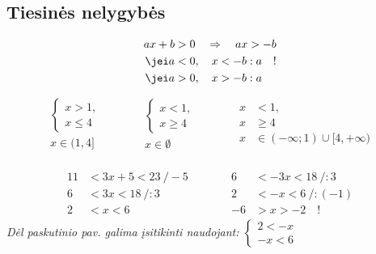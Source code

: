 
\subsection{Tiesinės nelygybės}
\begin{align*}
    \begin{aligned}
        ax + b > 0&\quad\Rightarrow\quad ax > -b     \\
        \jei a < 0&,\quad x < - b : a \quad !        \\
        \jei a > 0&,\quad x > - b : a                \\
    \end{aligned}
\end{align*}
\begin{align*}
    \begin{aligned}
        \begin{cases*} x > 1, \\ x \le 4 \end{cases*} \\
        x \in (1, 4]
    \end{aligned}
    \qquad\quad
    \begin{aligned}
        \begin{cases*} x < 1, \\ x \ge 4 \end{cases*} \\
        x \in \emptyset
    \end{aligned}
    \qquad\quad
    \begin{aligned}
        x& < 1,  \\
        x& \ge 4 \\
        x& \in (-\infty; 1)\cup[4, +\infty)
    \end{aligned}
\end{align*}

\begin{align*}
    \begin{aligned}
        11 &< 3x + 5 < 23 \  /-5   \\
        6  &< 3x     < 18 \  /: 3      \\
        2  &<  x     < 6  
    \end{aligned}
    \qquad\quad
    \begin{aligned}
        6 &< -3x < 18 \  /: 3     \\
        2 &<  -x < 6  \  /: (-1)  \\
        -6 &>  x > -2  \quad !
    \end{aligned}
\end{align*}
\textit{Dėl paskutinio pav. galima įsitikinti naudojant: }
$\begin{cases*}
    2 < -x \\
    -x < 6
\end{cases*}$

